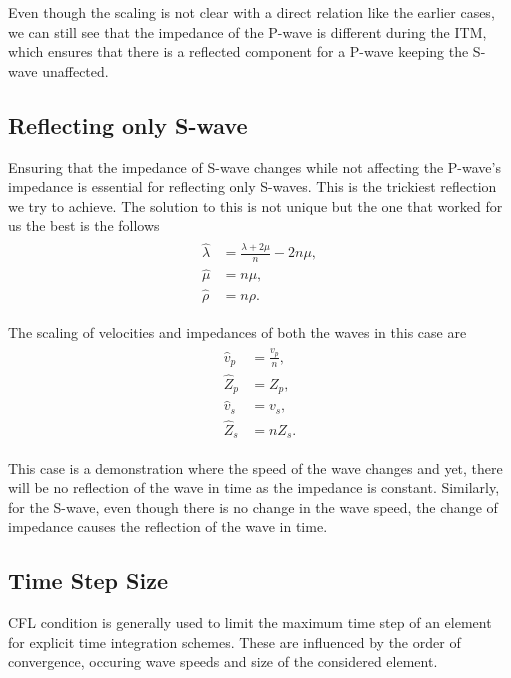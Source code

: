 Even though the scaling is not clear with a direct relation like the earlier cases, we can still see that the impedance of the P-wave is different during the \ac{ITM}, 
which ensures that there is a reflected component for a P-wave keeping the S-wave unaffected. 

\subsection{Reflecting only S-wave}\label{sec:reflecting_s}
Ensuring that the impedance of S-wave changes while not affecting the P-wave's impedance is essential for reflecting only S-waves. This is the trickiest
reflection we try to achieve. The solution to this is not unique but the one that worked for us the best is the follows
\begin{align}
    \begin{split}
        \hat{\lambda} &= \frac{\lambda + 2 \mu}{n} -  2n \mu ,\\
        \hat{\mu} &= n \mu ,\\
        \hat{\rho} &= n \rho .
    \end{split}
\end{align}

The scaling of velocities and impedances of both the waves in this case are
\begin{align}
    \begin{split}
        \hat{v}_p &= \frac{v_p}{n} ,\\
        \hat{Z}_p &= Z_p ,\\
        \hat{v}_s &= v_s ,\\
        \hat{Z}_s &= n Z_s .
    \end{split}
\end{align}

This case is a demonstration where the speed of the wave changes and yet, there will be no reflection of the wave in time as the impedance is constant.
Similarly, for the S-wave, even though there is no change in the wave speed, the change of impedance causes the reflection of the wave in time.

\subsection{Time Step Size}\label{sec:time_step_size}
\ac{CFL} condition is generally used to limit the maximum time step of an element for explicit time integration schemes. These are influenced by the order
of convergence, occuring wave speeds and size of the considered element.

